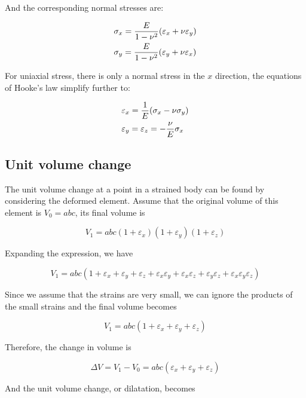 \documentclass[
10pt,
a4paper,
openany,
svgnames,
]{kaobook} %
\begin{document}
And the corresponding normal stresses are:

\begin{equation}
  \begin{gathered}
    \sigma_x = \frac{E}{1 - \nu^2}(\varepsilon_x + \nu \varepsilon_y) \hfill \\
    \sigma_y = \frac{E}{1 - \nu^2}(\varepsilon_y + \nu \varepsilon_x) \hfill
  \end{gathered}
\end{equation}

For uniaxial stress, there is only a normal stress in the $x$ direction, the equations of Hooke’s law simplify further to:

\begin{equation}
  \begin{gathered}
    \varepsilon_x = \frac{1}{E}({\sigma _x} - \nu \sigma_y) \hfill \\
    \varepsilon_y = {\varepsilon _z} =  - \frac{\nu }{E}{\sigma _x} \hfill \\ 
  \end{gathered}
\end{equation}

\subsection{Unit volume change}

The unit volume change at a point in a strained body can be found by considering the deformed element. Assume that the original volume of this element is $V_0 = abc$, its final volume is

\[V_1 = abc(1 + \varepsilon_x)(1 + \varepsilon_y)(1 + \varepsilon_z)\]

Expanding the expression, we have

\[V_1 = abc(1 + \varepsilon _x + \varepsilon _y + \varepsilon _z + \varepsilon_x\varepsilon_y + \varepsilon_x\varepsilon_z + \varepsilon_y\varepsilon_z + \varepsilon_x\varepsilon_y\varepsilon_z)\]

Since we assume that the strains are very small, we can ignore the products of the small strains and the final volume becomes

\[V_1 = abc(1 + \varepsilon_x + \varepsilon_y + \varepsilon_z)\]

Therefore, the change in volume is

\[\Delta V = V_1 - V_0 = abc(\varepsilon_x + \varepsilon_y + \varepsilon_z)\]

And the unit volume change, or dilatation, becomes
\end{document}
